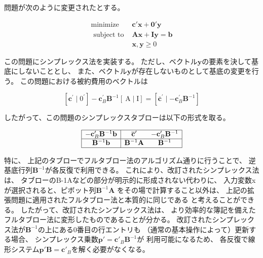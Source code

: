 \documentclass{jsarticle}
\begin{document}
問題が次のように変更されたとする。

\begin{equation}
  \begin{array}{rr}
  \operatorname{minimize} & \bm{c}'\bm{x}+\bm{0}'\bm{y} \\
  \text { subject to } & \bm{A}\bm{x}+\bm{I}\bm{y}=\bm{b} \\
  & \bm{x}, \bm{y} \geq 0
  \end{array}
\end{equation}

この問題にシンプレックス法を実装する。
ただし、ベクトル$\bm{y}$の要素を決して基底にしないこととし、
また、ベクトル$\bm{y}$が存在しないものとして基底の変更を行う。
この問題における被約費用のベクトルは

\begin{equation}
  \left[\mathbf{c}^{\prime} \mid 0^{\prime}\right]-\mathbf{c}_{B}^{\prime} \mathbf{B}^{-1}[\mathrm{~A} \mid \mathrm{I}]=\left[\overline{\mathbf{c}}^{\prime} \mid-\mathbf{c}_{B}^{\prime} \mathbf{B}^{-1}\right]
\end{equation}

したがって、この問題のシンプレックスタブローは以下の形式を取る。

\begin{equation}
  \begin{array}{|c|cc|}
  \hline-\mathbf{c}_{B}^{\prime} \mathbf{B}^{-1} \mathbf{b} & \overline{\mathbf{c}}^{\prime} & -\mathbf{c}_{B}^{\prime} \mathbf{B}^{-1} \\
  \hline \mathbf{B}^{-1} \mathbf{b} & \mathbf{B}^{-1} \mathbf{A} & \mathbf{B}^{-1} \\
  \hline
  \end{array}
\end{equation}

特に、
上記のタブローでフルタブロー法のアルゴリズム通りに行うことで、
逆基底行列$\bm{B}^{-1}$が各反復で利用できる。
これにより、改訂されたシンプレックス法は、
タブローのB-1Aなどの部分が明示的に形成されない代わりに、
入力変数xが選択されると、ピボット列$\bm{B}^{-1}\bm{A}$
をその場で計算すること以外は、
上記の拡張問題に適用されたフルタブロー法と本質的に同じである
と考えることができる。 
したがって、改訂されたシンプレックス法は、
より効率的な簿記を備えたフルタブロー法に変形したものであることが分かる。
改訂されたシンプレックス法が$\bm{B}^{-1}$の上にある0番目の行エントリも
（通常の基本操作によって）更新する場合、
シンプレックス乗数$\bm{p}'=\bm{c}'_B\bm{B}^{-1}$が
利用可能になるため、
各反復で線形システム$\bm{p}'\bm{B}=\bm{c}'_B$を解く必要がなくなる。
\end{document}
